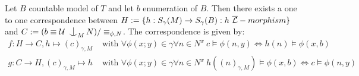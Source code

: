 \documentclass[../main.tex]{subfiles}
\begin{document}
\begin{theorem}

	Let $B$ countable model of $T$ and let $b$ enumeration of $B$.
	Then there exists a one to one correspondence between $H := \{h: S_{\gamma}(M) \to S_{\gamma}(B) : h \ \LLang-morphism\}$ and $C := (b \equiv \U \nonfork_M N)/\equiv_{\phi,N}$.
	The correspondence is given by:
	\begin{align*}
		f: H \to C, h \mapsto (c)_{\gamma,M} & \text{ with } \forall \phi(x;y) \in \gamma \forall n \in N^x \ c \models \phi(n,y) \iff h(n) \models \phi(x,b) \\
		g: C \to H, (c)_{\gamma,M} \mapsto h & \text{ with } \forall \phi(x;y) \in \gamma \forall n \in N^x \ h((n)_{\gamma,M}) \models \phi(x,b) \iff c \models \phi(n,y)
	\end{align*}

\end{theorem}
\end{document}
